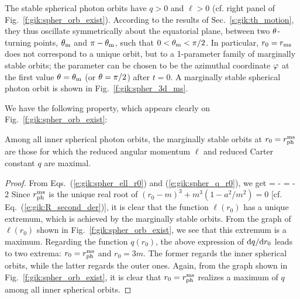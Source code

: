 The stable spherical photon orbits have $q>0$ and $\ell > 0$
(cf. right panel of Fig.~\ref{f:gik:spher_orb_exist}).
According to the results of Sec.~\ref{s:gik:th_motion}, they
thus oscillate symmetrically about the equatorial plane, between
two $\theta$-turning points, $\theta_{\rm m}$ and $\pi-\theta_{\rm m}$, such that $0<\theta_{\rm m}<\pi/2$.
In particular, $r_0 = r_{\rm ms}$ does not correspond to a unique orbit, but
to a 1-parameter family of marginally stable orbits; the parameter can be chosen
to be the azimuthal coordinate $\varphi$ at the first value $\theta=\theta_{\rm m}$ (or $\theta=\pi/2$)
after $t=0$. A marginally stable spherical photon orbit is
shown in Fig.~\ref{f:gik:spher_3d_ms}.

We have the following property, which appears clearly on Fig.~\ref{f:gik:spher_orb_exist}:
\begin{greybox}
Among all inner spherical photon orbits, the marginally stable orbits
at $r_0 = r_{\rm ph}^{\rm ms}$ are those for which the reduced angular momentum $\ell$
and reduced Carter constant $q$ are maximal.
\end{greybox}
\begin{proof}
From Eqs.~(\ref{e:gik:spher_ell_r0}) and (\ref{e:gik:spher_q_r0}), we get
\be \label{e:gik:spher_orb_dqdr}
    = - 
\ee
\be
    = - 2 
\ee
Since $r_{\rm ph}^{\rm ms}$ is the unique real root of
$(r_0 - m)^3 + m^3 (1 - a^2/m^2) = 0$ [cf. Eq.~(\ref{e:gik:R_second_der})],
it is clear that the function $\ell(r_0)$ has a unique extremum, which is
achieved by the marginally stable orbits. From the graph of $\ell(r_0)$
shown in Fig.~\ref{f:gik:spher_orb_exist}, we see that this extremum is
a maximum. Regarding the function $q(r_0)$, the above expression of $\mathrm{d} q/\mathrm{d} r_0$
leads to two extrema: $r_0 = r_{\rm ph}^{\rm ms}$ and $r_0 = 3 m$.
The former regards the inner spherical orbits, while the latter regards
the outer ones. Again, from the graph shown in Fig.~\ref{f:gik:spher_orb_exist},
it is clear that $r_0 = r_{\rm ph}^{\rm ms}$ realizes a maximum of $q$
among all inner spherical orbits.
\end{proof}


